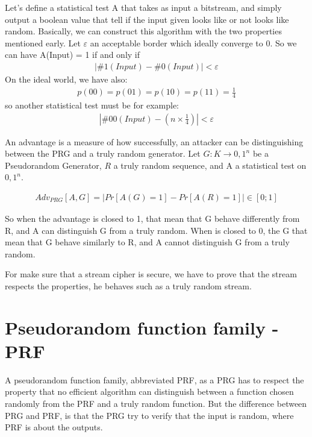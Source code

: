 \documentclass[10pt,a4paper]{report}
\begin{document}
Let's define a statistical test A that takes as input a bitstream, and simply output a boolean value that tell if the input given looks like or not looks like random.
Basically, we can construct this algorithm with the two properties mentioned early. \newline
Let $\varepsilon$ an acceptable border which ideally converge to 0.\newline
So we can have A(Input) = 1 if and only if 
\begin{align*} 
| \#1(Input) - \#0(Input) | < \varepsilon 
\end{align*}
On the ideal world, we have also: 
\begin{align*} 
p(00) = p(01) = p(10) = p(11) = \frac{1}{4} 
\end{align*}
so another statistical test must be for example:
\begin{align*} 
| \#00(Input) - (n \times \frac{1}{4} )   | < \varepsilon  
\end{align*} 

An advantage is a measure of how successfully, an attacker can be distinguishing between the PRG and a truly random generator.
Let $ G: K \rightarrow {0,1}^{n} $ be a Pseudorandom Generator, $R$ a truly random sequence, and A a statistical test on ${0,1}^{n}$.

\begin{align*} 
Adv_{PRG}[A,G] = | Pr[A(G)=1] - Pr[A(R)=1] | \in [0;1]
\end{align*} 

So when the advantage is closed to 1, that mean that G behave differently from R, and A can distinguish G from a truly random.
When is closed to 0, the G that mean that G behave similarly to R, and A cannot distinguish G from a truly random.

For make sure that a stream cipher is secure, we have to prove that the stream respects the properties, he behaves such as a truly random stream.

\section{Pseudorandom function family - PRF}

A pseudorandom function family, abbreviated PRF, as a PRG has to respect the property that no efficient algorithm can distinguish between a function chosen randomly from the PRF and a truly random function. But the difference between PRG and PRF, is that the PRG try to verify that the input is random, where PRF is about the outputs. 
\end{document}
